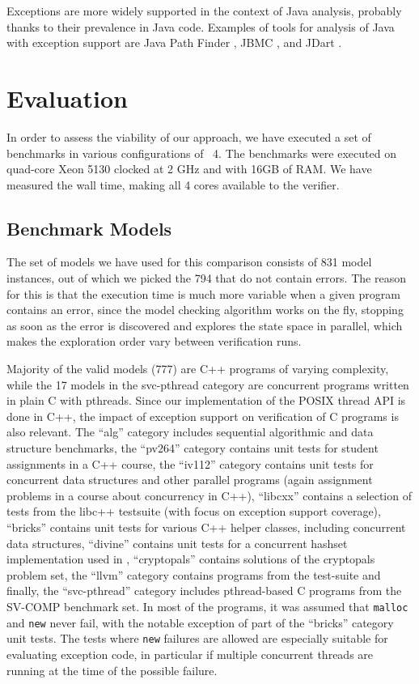 Exceptions are more widely supported in the context of Java analysis, probably thanks to their prevalence in Java code.
Examples of tools for analysis of Java with exception support are Java Path Finder , JBMC , and JDart .

\section{Evaluation}\label{sec:lang:evaluation}

In order to assess the viability of our approach, we have executed a set
of benchmarks in various configurations of \divine{}~4. The benchmarks were
executed on quad-core Xeon 5130 clocked at 2 GHz and with 16GB of RAM.
We have measured the wall time, making all 4 cores available to the
verifier.

\subsection{Benchmark Models}\label{benchmark-models}

The set of models we have used for this comparison consists of 831 model
instances, out of which we picked the 794 that do not contain errors.
The reason for this is that the execution time is much more variable
when a given program contains an error, since the model checking
algorithm works on the fly, stopping as soon as the error is discovered and
explores the state space in parallel, which makes the exploration order vary
between verification runs.

Majority of the valid models (777) are C++ programs of varying
complexity, while the 17 models in the svc-pthread category are
concurrent programs written in plain C with pthreads. Since our
implementation of the POSIX thread API is done in C++, the impact of
exception support on verification of C programs is also relevant. The
``alg'' category includes sequential algorithmic and data structure
benchmarks, the ``pv264'' category contains unit tests for student
assignments in a C++ course, the ``iv112'' category contains unit tests
for concurrent data structures and other parallel programs (again assignment
problems in a course about concurrency in C++), ``libcxx'' contains a selection
of tests from
the libc++ testsuite (with focus on exception support
coverage), ``bricks'' contains unit tests for various C++ helper
classes, including concurrent data structures, ``divine'' contains unit
tests for a concurrent hashset implementation used in \divine{},
``cryptopals'' contains solutions of the cryptopals problem
set, the ``llvm'' category
contains programs from the \llvm{} test-suite
and finally, the ``svc-pthread'' category includes pthread-based C
programs from the SV-COMP benchmark set. In most of the programs, it was
assumed that \texttt{malloc} and \texttt{new} never fail, with the
notable exception of part of the ``bricks'' category unit tests. The
tests where \texttt{new} failures are allowed are especially suitable
for evaluating exception code, in particular if multiple concurrent
threads are running at the time of the possible failure.


